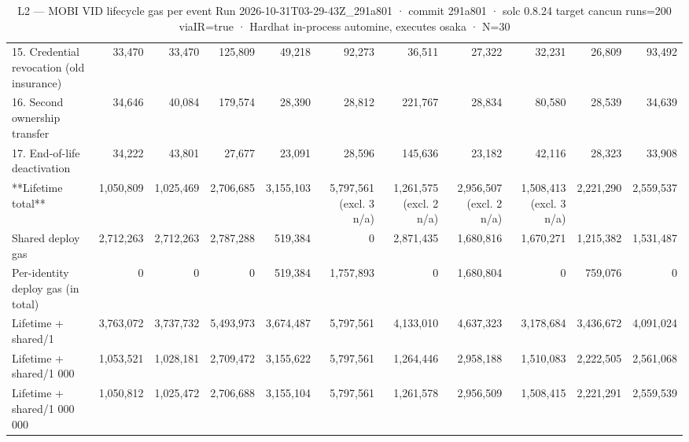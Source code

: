 \begin{table}[ht]
\begin{tabular}{lrrrrrrrrrr}
15. Credential revocation (old insurance) & 33,470 & 33,470 & 125,809 & 49,218 & 92,273 & 36,511 & 27,322 & 32,231 & 26,809 & 93,492 \\
16. Second ownership transfer & 34,646 & 40,084 & 179,574 & 28,390 & 28,812 & 221,767 & 28,834 & 80,580 & 28,539 & 34,639 \\
17. End-of-life deactivation & 34,222 & 43,801 & 27,677 & 23,091 & 28,596 & 145,636 & 23,182 & 42,116 & 28,323 & 33,908 \\
**Lifetime total** & 1,050,809 & 1,025,469 & 2,706,685 & 3,155,103 & 5,797,561 (excl. 3 n/a) & 1,261,575 (excl. 2 n/a) & 2,956,507 (excl. 2 n/a) & 1,508,413 (excl. 3 n/a) & 2,221,290 & 2,559,537 \\
Shared deploy gas & 2,712,263 & 2,712,263 & 2,787,288 & 519,384 & 0 & 2,871,435 & 1,680,816 & 1,670,271 & 1,215,382 & 1,531,487 \\
Per-identity deploy gas (in total) & 0 & 0 & 0 & 519,384 & 1,757,893 & 0 & 1,680,804 & 0 & 759,076 & 0 \\
Lifetime + shared/1 & 3,763,072 & 3,737,732 & 5,493,973 & 3,674,487 & 5,797,561 & 4,133,010 & 4,637,323 & 3,178,684 & 3,436,672 & 4,091,024 \\
Lifetime + shared/1 000 & 1,053,521 & 1,028,181 & 2,709,472 & 3,155,622 & 5,797,561 & 1,264,446 & 2,958,188 & 1,510,083 & 2,222,505 & 2,561,068 \\
Lifetime + shared/1 000 000 & 1,050,812 & 1,025,472 & 2,706,688 & 3,155,104 & 5,797,561 & 1,261,578 & 2,956,509 & 1,508,415 & 2,221,291 & 2,559,539 \\
\bottomrule
\end{tabular}
\caption{L2 — MOBI VID lifecycle gas per event Run 2026-10-31T03-29-43Z\_291a801 · commit 291a801 · solc 0.8.24 target cancun runs=200 viaIR=true · Hardhat in-process automine, executes osaka · N=30}
\label{tab:lifecycle_gas}
\end{table}
